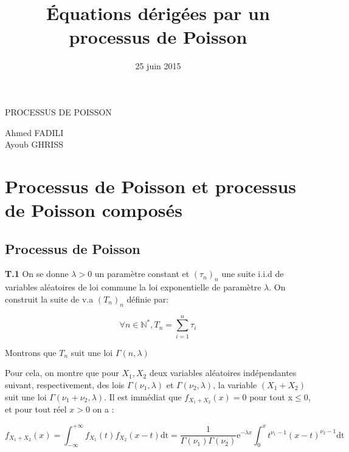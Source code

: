 PROCESSUS DE POISSON\documentclass[a4paper,10pt]{article}
\title{\'{E}quations d\'{e}rig\'{e}es par un processus de Poisson}
\date{25 juin 2015}
\begin{document}
\begin{flushright}
Ahmed FADILI \\
 Ayoub GHRISS \\
\end{flushright}

\lstset{style=customc}

\maketitle
\section[Processus de Poisson et processus de Poisson composés]{}
\section*{Processus de Poisson et processus de Poisson composés}

\subsection[Processus de Poisson]{Processus de Poisson}
\textbf{T.1} On se donne $\lambda>0$ un param\`{e}tre constant et $(\tau_{n})_{n}$ une suite i.i.d de variables al\'{e}atoires de loi commune la loi exponentielle de param\`{e}tre $\lambda$. On construit la suite de v.a $(T_{n})_{n}$ d\'{e}finie par:

$$
\forall n \in \mathbb{N^{*}}, T_{n}=\sum_{i=1}^{n}{\tau_{i}}
$$

Montrons que $T_{n}$ suit une loi $\Gamma(n,\lambda)$

Pour cela, on montre que pour $X_{1},X_{2}$ deux variables al\'{e}atoires ind\'{e}pendantes suivant, respectivement, des lois $\Gamma(\nu_{1},\lambda)$ et $\Gamma(\nu_{2},\lambda)$, la variable $(X_{1}+X_{2})$ suit une loi $\Gamma(\nu_{1}+\nu_{2},\lambda)$.
Il est imm\'{e}diat que $f_{X_{1}+X_{2}}(x)=0$ pour tout x$\leqslant0$, et pour tout r\'{e}el $x>0$ on a : 

$$
f_{X_{1}+X_{2}}(x)=\int_{-\infty}^{+\infty}{f_{X_{1}}(t)f_{X_{2}}(x-t)}\mathrm{dt}=\frac{1}{\Gamma(\nu_{1})\Gamma(\nu_{2})}\mathrm{e}^{-{\lambda}x}\int_{0}^{x}{t^{\nu_{1}-1}(x-t)^{\nu_{2}-1}}\mathrm{dt}
$$
\end{document}
